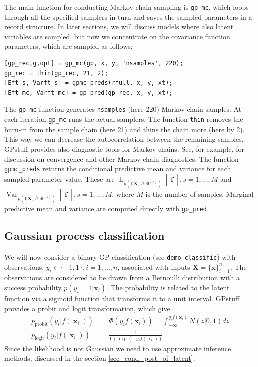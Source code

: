 \documentclass[twoside,11pt]{article}
\DeclareMathOperator{\x}{\mathbf{x}}
\DeclareMathOperator{\f}{\mathbf{f}}
\newcommand{\mb}{\mathbf}
\newcommand{\pkg}[1]{{\fontseries{b}\selectfont #1}}
\newcommand{\code}[1]{{\normalfont\texttt{#1}}}
\DeclareMathOperator{\E}{E}
\DeclareMathOperator{\VAR}{Var}
\begin{document}
The main function for conducting Markov chain sampling is \code{gp\_mc},
which loops through all the specified samplers in turn and saves the
sampled parameters in a record structure. In later sections, we will
discuss models where also latent variables are sampled, but now we
concentrate on the covariance function parameters, which are sampled
as follows:
%
\begin{verbatim}
[gp_rec,g,opt] = gp_mc(gp, x, y, 'nsamples', 220);
gp_rec = thin(gp_rec, 21, 2);
[Eft_s, Varft_s] = gpmc_preds(rfull, x, y, xt);
[Eft_mc, Varft_mc] = gp_pred(gp_rec, x, y, xt);
\end{verbatim}
% 
The \code{gp\_mc} function generates \code{nsamples} (here 220) Markov
chain samples. At each iteration \code{gp\_mc} runs the actual
samplers.  The function \code{thin} removes the burn-in from the
sample chain (here 21) and thins the chain more (here by 2). This way
we can decrease the autocorrelation between the remaining samples.
\pkg{GPstuff} provides also diagnostic tools for Markov chains. See,
for example,
\citep{Gelman+etal+BDA3:2013,Robert+Casella:2004} for
discussion on convergence and other Markov chain diagnostics. The
function \code{gpmc\_preds} returns the conditional predictive mean
and variance for each sampled parameter value. These are
$\E_{p(\mb{f}|\mb{X}, \mathcal{D}, \mb{\vartheta}^{(s)})}[\tilde{\f}],
s=1,...,M$ and $\VAR_{p(\mb{f}|\mb{X}, \mathcal{D},
  \mb{\vartheta}^{(s)})}[\tilde{\f}], s=1,...,M$, where $M$ is the
number of samples.
%
Marginal predictive mean and variance are computed directly with
\code{gp\_pred}.
%

\subsection{Gaussian process classification}\label{GP_classification}


We will now consider a binary GP classification (see
\code{demo\_classific}) with observations, $y_i \in \{-1,1\},
i=1,...,n$, associated with inputs $\mb{X} = \{ \mb{x} \}_ {i=1}^n$.
The observations are considered to be drawn from a Bernoulli
distribution with a success probability $p(y_i=1|\mb{x}_i)$. The
probability is related to the latent function via a sigmoid function
that transforms it to a unit interval. \pkg{GPstuff} provides a probit
and logit transformation, which give
%
\begin{align}\label{eq_probit_likelihood}
p_{\text{probit}}(y_i|f(\x_i)) &= \Phi(y_if(\mb{x}_i)) =
\int_{-\infty}^{y_if(\mb{x}_i)} N(z|0,1) d z \\
p_{\text{logit}}(y_i|f(\x_i)) &= \frac{1}{1 + \exp(-y_if(\x_i))}.\label{eq_logit_likelihood}
\end{align}
% 
Since the likelihood is not Gaussian we need to use approximate
inference methods, discussed in the section
\ref{sec_cond_post_of_latent}.
\end{document}
